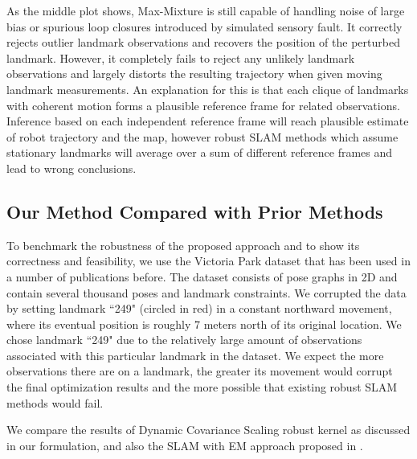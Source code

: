 As the middle plot shows, Max-Mixture is still capable of handling noise of
large bias or spurious loop closures introduced by simulated sensory fault. It
correctly rejects outlier landmark observations and recovers the position of
the perturbed landmark. However, it completely fails to reject any unlikely
landmark observations and largely distorts the resulting trajectory when given
moving landmark measurements. An explanation for this is that each clique of
landmarks with coherent motion forms a plausible reference frame for related
observations. Inference based on each independent reference frame will reach
plausible estimate of robot trajectory and the map, however robust SLAM methods
which assume stationary landmarks will average over a sum of different
reference frames and lead to wrong conclusions.

\subsection{Our Method Compared with Prior Methods}

To benchmark the robustness of the proposed approach and to show its
correctness and feasibility, we use the Victoria Park dataset that has been
used in a number of publications before. The dataset consists of pose graphs in
2D and contain several thousand poses and landmark constraints. We corrupted
the data by setting landmark ``249" (circled in red) in a constant northward
movement, where its eventual position is roughly 7 meters north of its original
location. We chose landmark ``249" due to the relatively large amount of
observations associated with this particular landmark in the dataset. We expect
the more observations there are on a landmark, the greater its movement would
corrupt the final optimization results and the more possible that existing
robust SLAM methods would fail.

We compare the results of Dynamic Covariance Scaling robust kernel as discussed in our
formulation, and also the SLAM with EM approach proposed in \cite{rogers2010slam}.

